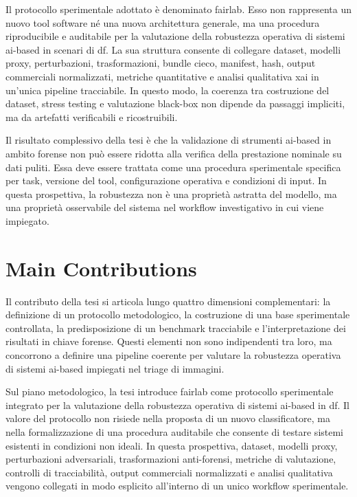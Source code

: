 Il protocollo sperimentale adottato è denominato \gls{fairlab}. Esso non
rappresenta un nuovo tool software né una nuova architettura generale, ma una
procedura riproducibile e auditabile per la valutazione della robustezza
operativa di sistemi \gls{ai}-based in scenari di \gls{df}. La sua struttura
consente di collegare dataset, modelli proxy, perturbazioni, trasformazioni,
bundle cieco, manifest, hash, output commerciali normalizzati, metriche
quantitative e analisi qualitativa \gls{xai} in un'unica pipeline tracciabile.
In questo modo, la coerenza tra costruzione del dataset, stress testing e
valutazione black-box non dipende da passaggi impliciti, ma da artefatti
verificabili e ricostruibili.

Il risultato complessivo della tesi è che la validazione di strumenti
\gls{ai}-based in ambito forense non può essere ridotta alla verifica della
prestazione nominale su dati puliti. Essa deve essere trattata come una procedura
sperimentale specifica per task, versione del tool, configurazione operativa e
condizioni di input. In questa prospettiva, la robustezza non è una proprietà
astratta del modello, ma una proprietà osservabile del sistema nel workflow
investigativo in cui viene impiegato.


\section{Main Contributions}
\label{sec:conclusions-contributions}

Il contributo della tesi si articola lungo quattro dimensioni complementari:
la definizione di un protocollo metodologico, la costruzione di una base
sperimentale controllata, la predisposizione di un benchmark tracciabile e
l'interpretazione dei risultati in chiave forense. Questi elementi non sono
indipendenti tra loro, ma concorrono a definire una pipeline coerente per
valutare la robustezza operativa di sistemi \gls{ai}-based impiegati nel triage
di immagini.

Sul piano metodologico, la tesi introduce \gls{fairlab} come protocollo
sperimentale integrato per la valutazione della robustezza operativa di sistemi
\gls{ai}-based in \gls{df}. Il valore del protocollo non risiede nella proposta
di un nuovo classificatore, ma nella formalizzazione di una procedura auditabile
che consente di testare sistemi esistenti in condizioni non ideali. In questa
prospettiva, dataset, modelli proxy, perturbazioni adversariali, trasformazioni
anti-forensi, metriche di valutazione, controlli di tracciabilità, output
commerciali normalizzati e analisi qualitativa vengono collegati in modo
esplicito all'interno di un unico workflow sperimentale.

